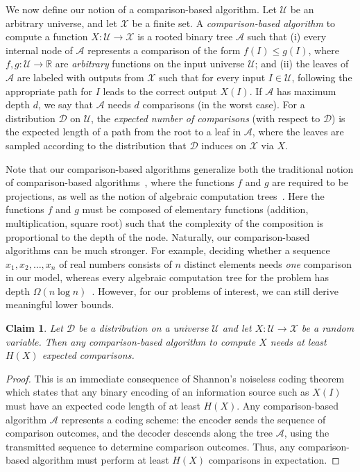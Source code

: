 \documentclass{siamltex}
\newcommand{\cA}{\mathcal{A}}
\newcommand{\D}{\mathcal{D}}
\newcommand{\cU}{\mathcal{U}}
\newcommand{\cX}{\mathcal{X}}
\newcommand{\R}{\mathbb R}
\newtheorem{claim}[theorem]{Claim}
\begin{document}
We now define our notion of a comparison-based algorithm.
Let $\cU$ be an arbitrary universe, and let $\cX$ be a finite set.
A \emph{comparison-based algorithm} to compute a function 
$X : \cU \rightarrow \cX$ is a rooted binary tree $\cA$
such that (i) every internal node of $\cA$ represents a comparison of the 
form $f(I) \leq g(I)$, where $f,g : \cU \rightarrow \R$ are 
\emph{arbitrary} functions on the input universe $\cU$;
and (ii) the leaves of $\cA$ are labeled with outputs from $\cX$ such
that for every input $I \in \cU$, following the appropriate path for
$I$ leads to the correct output $X(I)$. If $\cA$ has maximum depth $d$, we
say that $\cA$ needs $d$ comparisons (in the worst case). For a
distribution $\D$ on $\cU$, the \emph{expected number of comparisons}
(with respect to $\D$) is the expected length of a path from
the root to a leaf in $\cA$, where the leaves are sampled according
to the distribution that $\D$ induces on $\cX$ via $X$.

Note that our 
comparison-based algorithms generalize both the traditional
notion of comparison-based algorithms~\cite[Chapter~8.1]{CormenLeRiSt09}, 
where the functions $f$ and $g$ are required to be 
projections, as well as the notion
of algebraic computation trees~\cite[Chapter~16.2]{AroraBa09}. Here the
functions $f$ and $g$ must be composed of elementary functions
(addition, multiplication, square root) such that the complexity  of 
the composition is proportional to the depth of the node. Naturally,
our comparison-based algorithms can be much stronger. For example,
deciding whether a sequence $x_1, x_2, \ldots, x_n$ of real numbers
consists of $n$ distinct elements needs \emph{one} comparison in our model,
whereas every algebraic computation tree for the problem
has depth $\Omega(n \log n)$~\cite[Chapter~16.2]{AroraBa09}. However,
for our problems of interest, we can still derive meaningful lower bounds.

\begin{claim}\label{clm:entropy-lower}
Let $\D$ be a distribution on a universe $\cU$ and let 
$X : \cU \rightarrow \cX$ be a random variable. Then any
comparison-based algorithm to compute $X$ needs 
at least $H(X)$ expected comparisons.
\end{claim}
\begin{proof}
This is an immediate consequence of Shannon's noiseless coding 
theorem~\cite[Theorem~5.4.1]{CoverTh06}
which states that any binary encoding
of an information source such as $X(I)$ must have an expected
code length of at least $H(X)$. Any comparison-based algorithm $\cA$
represents a coding scheme: the encoder sends the sequence of comparison
outcomes, and the decoder descends along the tree $\cA$, using the transmitted
sequence to determine comparison outcomes. Thus, any comparison-based
algorithm must perform at least $H(X)$ comparisons in expectation. 
\end{proof}
\medskip
\end{document}
